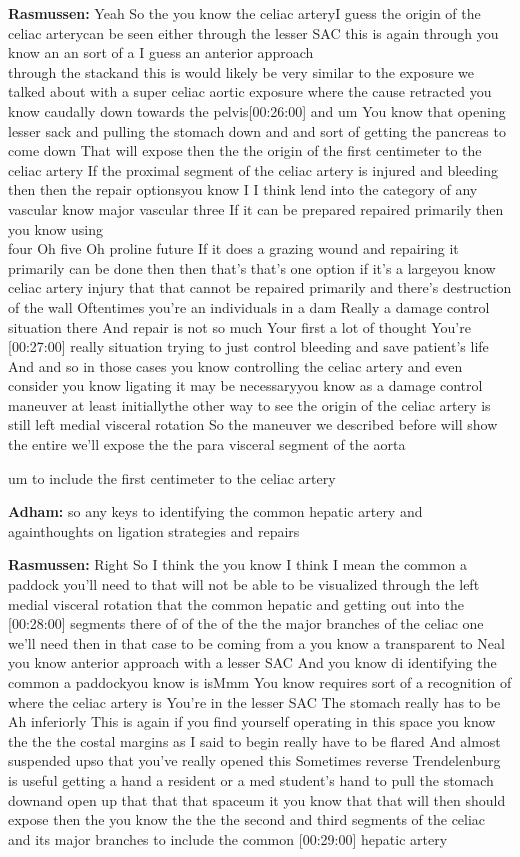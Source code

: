 \documentclass[
]{book}
\begin{document}
\textbf{Rasmussen:} Yeah So the you know the celiac arteryI guess the origin
of the celiac arterycan be seen either through the lesser SAC this is
again through you know an an sort of a I guess an anterior approach\\
through the stackand this is would likely be very similar to the
exposure we talked about with a super celiac aortic exposure where the
cause retracted you know caudally down towards the pelvis{[}00:26:00{]} and
um You know that opening lesser sack and pulling the stomach down and
and sort of getting the pancreas to come down That will expose then the
the origin of the first centimeter to the celiac artery If the proximal
segment of the celiac artery is injured and bleeding then then the
repair optionsyou know I I think lend into the category of any vascular
know major vascular three If it can be prepared repaired primarily then
you know using\\
four Oh five Oh proline future If it does a grazing wound and repairing
it primarily can be done then then that's that's one option if it's a
largeyou know\\
celiac artery injury that that cannot be repaired primarily and there's
destruction of the wall Oftentimes you're an individuals in a dam Really
a damage control situation there And repair is not so much Your first a
lot of thought You're {[}00:27:00{]} really situation trying to just control
bleeding and save patient's life And and so in those cases you know
controlling the celiac artery and even consider you know ligating it may
be necessaryyou know as a damage control maneuver at least initiallythe
other way to see the origin of the celiac artery is still left medial
visceral rotation So the maneuver we described before will show the
entire we'll expose the the para visceral segment of the aorta

um to include the first centimeter to the celiac artery

\textbf{Adham:} so any keys to identifying the common hepatic artery and
againthoughts on ligation strategies and repairs

\textbf{Rasmussen:} Right So I think the you know I think I mean the common a
paddock you'll need to that will not be able to be visualized through
the left medial visceral rotation that the common hepatic and getting
out into the {[}00:28:00{]} segments there of of the of the the major
branches of the celiac one we'll need then in that case to be coming
from a you know a transparent to Neal you know anterior approach with a
lesser SAC And you know di identifying the common a paddockyou know is
isMmm You know requires sort of a recognition of where the celiac artery
is You're in the lesser SAC The stomach really has to be Ah inferiorly
This is again if you find yourself operating in this space you know the
the the costal margins as I said to begin really have to be flared And
almost suspended upso that you've really opened this Sometimes reverse
Trendelenburg is useful getting a hand a resident or a med student's
hand to pull the stomach downand open up that that that spaceum it you
know that that will then should expose then the you know the the the
second and third segments of the celiac and its major branches to
include the common {[}00:29:00{]} hepatic artery
\end{document}
